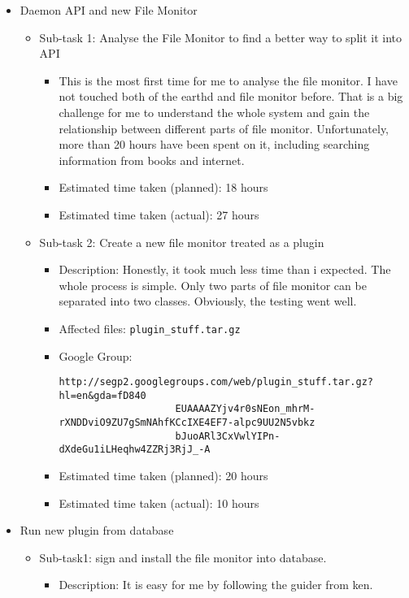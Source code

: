 \begin{itemize}
	\item Daemon API and new File Monitor
	     \begin{itemize}
	        \item Sub-task 1: Analyse the File Monitor to find a better way to split it into API
	           \begin{itemize}
					\item This is the most first time for me to analyse the file monitor. I have not touched both of the earthd and file monitor before. That is a big challenge for me to understand the whole system and gain the relationship between different parts of file monitor. Unfortunately, more than 20 hours have been spent on it, including searching information from books and internet. 
					\item Estimated time taken (planned): 18 hours
					\item Estimated time taken (actual): 27 hours
				\end{itemize}
			\item Sub-task 2: Create a new file monitor treated as a plugin
			   \begin{itemize}
					\item Description: Honestly, it took much less time than i expected. The whole process is simple. Only two parts of file monitor can be separated into two classes. Obviously, the testing went well.
					\item Affected files: \texttt{plugin\_stuff.tar.gz} 
					\item Google Group: \begin{verbatim}http://segp2.googlegroups.com/web/plugin_stuff.tar.gz?hl=en&gda=fD840
					EUAAAAZYjv4r0sNEon_mhrM-rXNDDviO9ZU7gSmNAhfKCcIXE4EF7-alpc9UU2N5vbkz
					bJuoARl3CxVwlYIPn-dXdeGu1iLHeqhw4ZZRj3RjJ_-A\end{verbatim}
					\item Estimated time taken (planned): 20 hours
					\item Estimated time taken (actual): 10 hours
				\end{itemize}
	     \end{itemize}
	\item Run new plugin from database
	     \begin{itemize}
	         \item Sub-task1: sign and install the file monitor into database.
	            \begin{itemize}
							\item Description: It is easy for me by following the guider from ken. 

\end{itemize}
\end{itemize}
\end{itemize}
